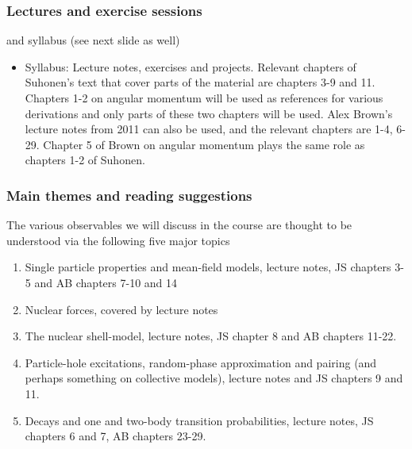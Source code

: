 \documentclass[compress]{beamer}
\begin{document}
\frame
{
  \frametitle{Lectures and exercise sessions}
  \begin{block}{and syllabus (see next slide as well)}
\begin{itemize}
\item Syllabus: Lecture notes, exercises and projects. Relevant chapters of Suhonen's text that cover parts of the material are chapters 3-9 and 11. Chapters 1-2 on angular momentum will be used as references for various derivations and only parts of these two chapters will be used. Alex Brown's lecture notes from 2011 can also be used, and the relevant chapters are 1-4, 6-29. Chapter 5 of Brown on angular momentum plays the same role as chapters 1-2 of Suhonen. 
\end{itemize}
  \end{block}
}



\frame
{
  \frametitle{Main themes and reading suggestions}
\begin{small}
{\scriptsize
The various observables we will discuss in the course are thought to be understood via the following five 
major topics
\begin{enumerate}
\item Single  particle properties and mean-field models, lecture notes, JS chapters 3-5 and AB chapters 7-10 and 14
\item Nuclear forces, covered by lecture notes
\item The nuclear shell-model, lecture notes, JS chapter 8 and AB chapters 11-22.
\item Particle-hole excitations, random-phase approximation and pairing (and perhaps something on collective models), lecture notes and JS chapters 9 and 11.
\item Decays and one and two-body transition probabilities, lecture notes, JS chapters 6 and 7, AB chapters 23-29.
\end{enumerate}
}
\end{small}
}
\end{document}
